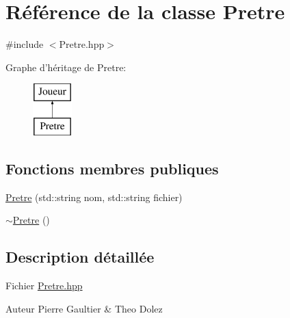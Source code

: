 \hypertarget{class_pretre}{\section{Référence de la classe Pretre}
\label{class_pretre}
}


{\ttfamily \#include $<$Pretre.\-hpp$>$}

Graphe d'héritage de Pretre\-:\begin{figure}[H]
\begin{center}
\leavevmode
\includegraphics[height=2.000000cm]{class_pretre}
\end{center}
\end{figure}
\subsection*{Fonctions membres publiques}
\begin{DoxyCompactItemize}
\item 
\hyperlink{class_pretre_a05462a17df09bcc3c84cebdcb994b9a5}{Pretre} (std\-::string nom, std\-::string fichier)
\item 
\hyperlink{class_pretre_a9235b9c5f1c57e7d6bb8cba648c43414}{$\sim$\-Pretre} ()
\end{DoxyCompactItemize}


\subsection{Description détaillée}
Fichier \hyperlink{_pretre_8hpp}{Pretre.\-hpp} \begin{DoxyAuthor}{Auteur}
Pierre Gaultier \& Theo Dolez 
\end{DoxyAuthor}


